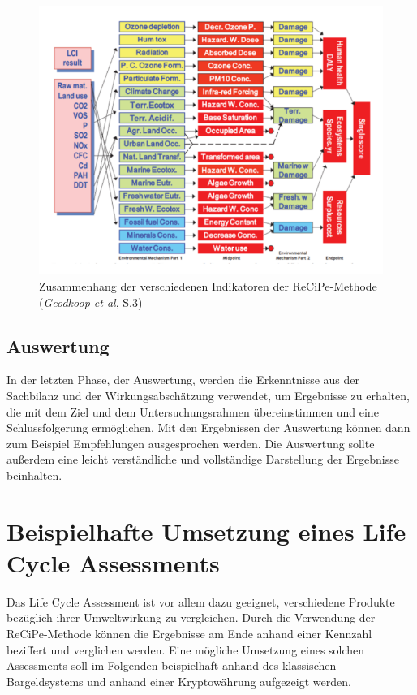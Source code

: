 \documentclass[12pt]{article}
\begin{document}
\begin{figure}[ht!]
    \centering
    \includegraphics[width=.75\textwidth]{quellen/recipe.png}
    \caption[Zusammenhang der verschiedenen Indikatoren der ReCiPe-Methode]{Zusammenhang der verschiedenen Indikatoren der ReCiPe-Methode (\textit{Geodkoop et al}, S.3)}
\end{figure}
\FloatBarrier

\subsection{Auswertung}
In der letzten Phase, der Auswertung, werden die Erkenntnisse aus der Sachbilanz und der Wirkungsabschätzung verwendet, um Ergebnisse zu erhalten, die mit dem Ziel und dem Untersuchungsrahmen übereinstimmen und eine Schlussfolgerung ermöglichen. Mit den Ergebnissen der Auswertung können dann zum Beispiel Empfehlungen ausgesprochen werden. Die Auswertung sollte außerdem eine leicht verständliche und vollständige Darstellung der Ergebnisse beinhalten.

\section{Beispielhafte Umsetzung eines Life Cycle Assessments}
Das Life Cycle Assessment ist vor allem dazu geeignet, verschiedene Produkte bezüglich ihrer Umweltwirkung zu vergleichen. Durch die Verwendung der ReCiPe-Methode können die Ergebnisse am Ende anhand einer Kennzahl beziffert und verglichen werden. Eine mögliche Umsetzung eines solchen Assessments soll im Folgenden beispielhaft anhand des klassischen Bargeldsystems und anhand einer Kryptowährung aufgezeigt werden.
\end{document}
